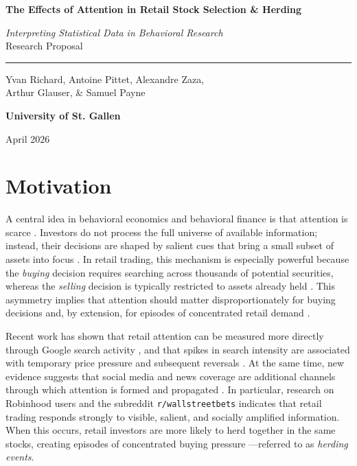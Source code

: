 \documentclass[12pt]{article}
\begin{document}
\begin{titlepage}
    \centering
    \vspace*{4.7cm}
    {\LARGE \textbf{The Effects of Attention in Retail Stock Selection \& Herding} \par}
    \vspace{2em}
    {\large \textit{Interpreting Statistical Data in Behavioral Research} \\[1em]
    Research Proposal \par}

    \begin{center}
    \rule{0.5\linewidth}{0.1pt}
    \end{center}

    \vspace{1em}
    {\small Yvan Richard, Antoine Pittet, Alexandre Zaza, \\[0.5em]
    Arthur Glauser, \& Samuel Payne \par
    \vspace{2em}
    \textbf{University of St. Gallen} \par
    \vspace{1em}
    April 2026 \par}
\end{titlepage}

\tableofcontents
\newpage

\section{Motivation}

A central idea in behavioral economics and behavioral finance is that attention is scarce \parencite{Kahneman1973,Kahneman2011}.
Investors do not process the full universe of available information; instead,
their decisions are shaped by salient cues that bring a small subset of assets into focus \parencite{BarberOdean2008}.
In retail trading, this mechanism is especially powerful because the \emph{buying} decision
requires searching across thousands of potential securities, whereas the \emph{selling} decision
is typically restricted to assets already held \parencite{Welch2022}. This asymmetry implies that attention
should matter disproportionately for buying decisions and, by extension, for
episodes of concentrated retail demand \parencite{BarberEtal2022}.

Recent work has shown that retail attention can be measured more directly through Google
search activity \parencite{DaEtal2011,deHaanEtal2024}, and that spikes in search intensity are associated with
temporary price pressure and subsequent reversals \parencite{BarberEtal2022, ArdiaEtal2023}. At
the same time, new evidence suggests that social media and news coverage are additional
channels through which attention is formed and propagated \parencite{DeGiorgiEtal2026}.
In particular, research on Robinhood users and the subreddit \texttt{r/wallstreetbets} indicates
that retail trading responds strongly to visible, salient, and socially amplified information.
When this occurs, retail investors are more likely to herd together in the same stocks, creating episodes of
concentrated buying pressure \parencite{BarberEtal2022,ArdiaEtal2023}---referred to as \emph{herding events}.
\end{document}
